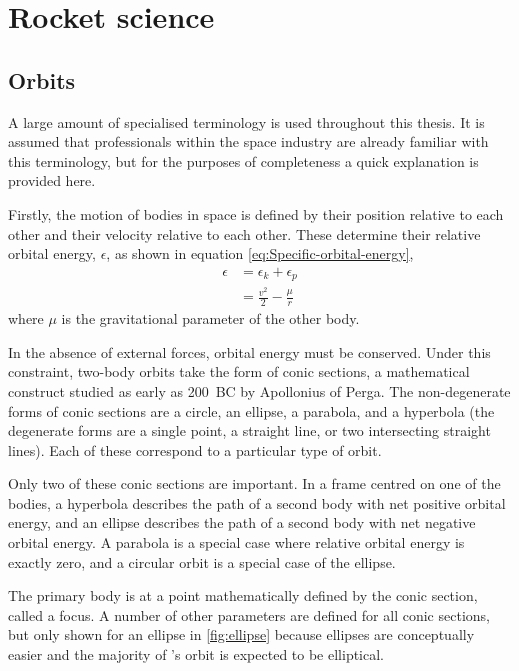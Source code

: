 \chapter{Rocket science} \label{cha:Rocket-science}

\section{Orbits} \label{sec:Orbits}

A large amount of specialised terminology is used throughout this thesis. It is assumed that professionals within the space industry are already familiar with this terminology, but for the purposes of completeness a quick explanation is provided here. 

Firstly, the motion of bodies in space is defined by their position relative to each other and their velocity relative to each other. These determine their relative orbital energy, $\epsilon$, as shown in equation \eqref{eq:Specific-orbital-energy}, %
\begin{subequations} \label{eq:Specific-orbital-energy}
\begin{align} 
\epsilon &= \epsilon_k + \epsilon_p \\
&= \frac{v^2}{2} - \frac{\mu}{r}
\end{align}
\end{subequations}
where $\mu$ is the gravitational parameter of the other body.

In the absence of external forces, orbital energy must be conserved. Under this constraint, two-body orbits take the form of conic sections, a mathematical construct studied as early as 200~BC by Apollonius of Perga. The non-degenerate forms of conic sections are a circle, an ellipse, a parabola, and a hyperbola (the degenerate forms are a single point, a straight line, or two intersecting straight lines). Each of these correspond to a particular type of orbit. 

Only two of these conic sections are important. In a frame centred on one of the bodies, a hyperbola describes the path of a second body with net positive orbital energy, and an ellipse describes the path of a second body with net negative orbital energy. A parabola is a special case where relative orbital energy is exactly zero, and a circular orbit is a special case of the ellipse. 

The primary body is at a point mathematically defined by the conic section, called a focus. A number of other parameters are defined for all conic sections, but only shown for an ellipse in \autoref{fig:ellipse} because ellipses are conceptually easier and the majority of \BW's orbit is expected to be elliptical.

